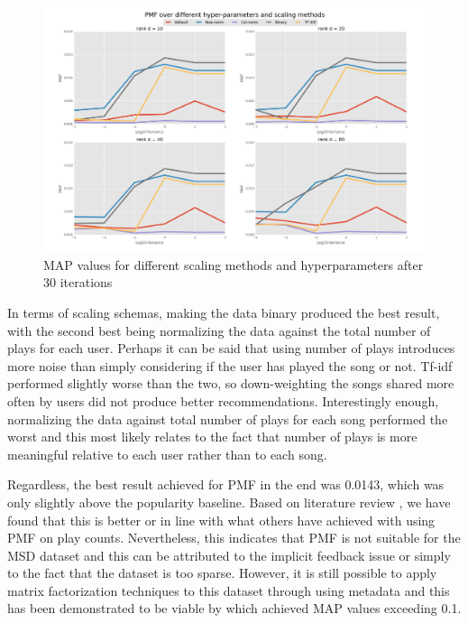 \documentclass[11pt,preprint]{aastex}
\begin{document}
\begin{figure}[htbp] %
   \centering
   \includegraphics[width=6in]{../plots/final/PMF.png} 
   \caption{MAP values for different scaling methods and hyperparameters after 30 iterations}
   \label{fig:PMF}
\end{figure}

In terms of scaling schemas, making the data binary produced the best result, with the second best being normalizing the data against the total number of plays for each user. Perhaps it can be said that using number of plays introduces more noise than simply considering if the user has played the song or not. Tf-idf performed slightly worse than the two, so down-weighting the songs shared more often by users did not produce better recommendations. Interestingly enough, normalizing the data against total number of plays for each song performed the worst and this most likely relates to the fact that number of plays is more meaningful relative to each user rather than to each song. 
 
Regardless, the best result achieved for PMF in the end was 0.0143, which was only slightly above the popularity baseline. Based on literature review \citep{li2012million, McFee:2012:MSD:2187980.2188222}, we have found that this is better or in line with what others have achieved with using PMF on play counts. Nevertheless, this indicates that PMF is not suitable for the MSD dataset and this can be attributed to the implicit feedback issue or simply to the fact that the dataset is too sparse. However, it is still possible to apply matrix factorization techniques to this dataset through using metadata and this has been demonstrated to be viable by \citet{liangcodebook} which achieved MAP values exceeding 0.1.  
\end{document}
